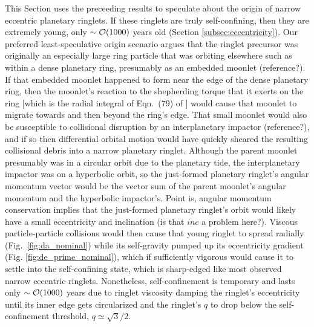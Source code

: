 \documentclass[preprint]{aastex62}
\begin{document}
This Section uses the preceeding results to speculate about the origin of narrow eccentric planetary ringlets.
If these ringlets are truly self-confining, then they are extremely young,
only $\sim{\cal O}(1000)$ years old (Section \ref{subsec:eccentricity}). Our preferred 
least-speculative origin scenario argues that
the ringlet precursor was originally an especially large ring particle that was orbiting elsewhere such as
within a dense planetary ring, presumably as an embedded moonlet (reference?). If that embedded moonlet happened to 
form near the edge of the dense planetary ring, then the moonlet's reaction to
the shepherding torque that it exerts on the ring [which is the radial integral of Eqn.\ (79) of \cite{GT82}] would
cause that moonlet to migrate towards and then beyond the ring's edge. That small moonlet would also be
susceptible to collisional disruption by an interplanetary impactor (reference?), and if so then
differential orbital motion would have quickly sheared the resulting collisional debris into a narrow planetary ringlet.
Although the parent moonlet presumably was in a circular orbit due to the planetary tide, the interplanetary
impactor was on a hyperbolic orbit, so the just-formed planetary ringlet's angular momentum vector
would be the vector sum of the parent moonlet's angular momentum and the hyperbolic impactor's. 
Point is, angular momentum conservation implies that the just-formed planetary ringlet's orbit
would likely have a small eccentricity and inclination (is that $inc$ a problem here?). Viscous particle-particle
collisions would then cause that young ringlet to spread radially (Fig.\ \ref{fig:da_nominal}) 
while its self-gravity pumped up its eccentricity gradient (Fig. \ref{fig:de_prime_nominal}), 
which if sufficiently vigorous would cause it to settle into the self-confining state, 
which is sharp-edged like most observed narrow eccentric ringlets. Nonetheless, self-confinement is temporary
and lasts only $\sim{\cal O}(1000)$ years due to ringlet viscosity damping the ringlet's eccentricity until its inner edge gets circularized and the ringlet's $q$ to drop below the self-confinement threshold, $q\simeq\sqrt{3}/2$.
\end{document}
